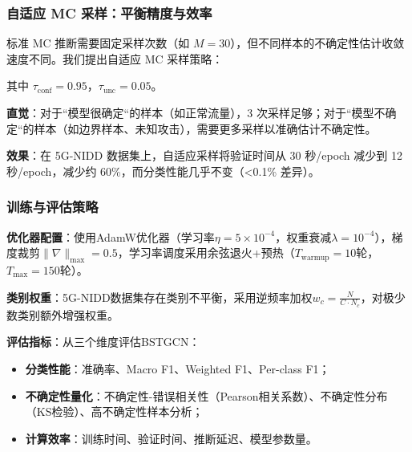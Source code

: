 \subsubsection{自适应 MC 采样：平衡精度与效率}

标准 MC 推断需要固定采样次数（如 $M=30$），但不同样本的不确定性估计收敛速度不同。我们提出自适应 MC 采样策略：


其中 $\tau_{\text{conf}}=0.95$，$\tau_{\text{unc}}=0.05$。

\textbf{直觉}：对于``模型很确定``的样本（如正常流量），3 次采样足够；对于``模型不确定``的样本（如边界样本、未知攻击），需要更多采样以准确估计不确定性。

\textbf{效果}：在 5G-NIDD 数据集上，自适应采样将验证时间从 30 秒/epoch 减少到 12 秒/epoch，减少约 60\%，而分类性能几乎不变（<0.1\% 差异）。

\subsubsection{训练与评估策略}

\textbf{优化器配置}：使用AdamW优化器（学习率$\eta=5\times10^{-4}$，权重衰减$\lambda=10^{-4}$），梯度裁剪$\|\nabla\|_{\max}=0.5$，学习率调度采用余弦退火+预热（$T_{\text{warmup}}=10$轮，$T_{\max}=150$轮）。

\textbf{类别权重}：5G-NIDD数据集存在类别不平衡，采用逆频率加权$w_c = \frac{N}{C \cdot N_c}$，对极少数类别额外增强权重。

\textbf{评估指标}：从三个维度评估BSTGCN：

\begin{itemize}
  \item \textbf{分类性能}：准确率、Macro F1、Weighted F1、Per-class F1；
  \item \textbf{不确定性量化}：不确定性-错误相关性（Pearson相关系数）、不确定性分布（KS检验）、高不确定性样本分析；
  \item \textbf{计算效率}：训练时间、验证时间、推断延迟、模型参数量。
\end{itemize}

